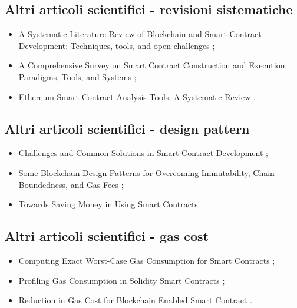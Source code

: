 \subsection*{Altri articoli scientifici - revisioni sistematiche}
\begin{itemize}

\item A Systematic Literature Review of Blockchain and Smart Contract Development: Techniques, tools, and open challenges \cite{vacca2021literature};

\item A Comprehensive Survey on Smart Contract Construction and Execution: Paradigms, Tools, and Systems \cite{hu2021survey};

\item Ethereum Smart Contract Analysis Tools: A Systematic Review \cite{kushwaha2022tools}.

\end{itemize}

\subsection*{Altri articoli scientifici - design pattern}
\begin{itemize}

\item Challenges and Common Solutions in Smart Contract Development \cite{kannengiesser2022challanges};

\item Some Blockchain Design Patterns for Overcoming Immutability, Chain-Boundedness, and Gas Fees \cite{mandarino2022patterns};

\item Towards Saving Money in Using Smart Contracts \cite{chen2018gas}.

\end{itemize}

\subsection*{Altri articoli scientifici - gas cost}
\begin{itemize}

\item Computing Exact Worst-Case Gas Consumption for Smart Contracts \cite{marescotti2018gascost};

\item Profiling Gas Consumption in Solidity Smart Contracts \cite{disorbo2022gascost};

\item Reduction in Gas Cost for Blockchain Enabled Smart Contract \cite{masla2021gascost}.

\end{itemize}


